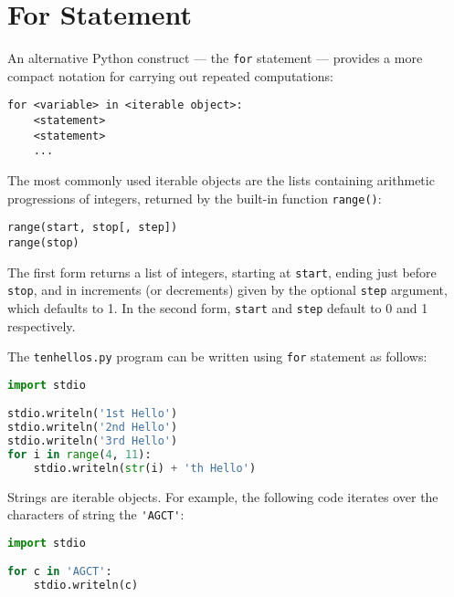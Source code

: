 \documentclass[8pt,a4paper,compress,handout]{beamer}
\begin{document}
\section{For Statement}
\begin{frame}[fragile]
An alternative Python construct --- the \lstinline{for} statement --- provides a more compact notation for carrying out repeated computations:

\smallskip

\begin{lstlisting}[language={}]
for <variable> in <iterable object>:
    <statement>
    <statement>
    ...
\end{lstlisting}

\bigskip

The most commonly used iterable objects are the lists containing arithmetic progressions of integers, returned by the built-in function \lstinline{range()}:

\begin{lstlisting}[language={}]
range(start, stop[, step])
range(stop)
\end{lstlisting}

The first form returns a list of integers, starting at \lstinline{start}, ending just before \lstinline{stop}, and in increments (or decrements) given by the optional \lstinline{step} argument, which defaults to 1. In the second form, \lstinline{start} and \lstinline{step} default to 0 and 1 respectively.
\end{frame}

\begin{frame}[fragile]
The \lstinline{tenhellos.py} program can be written using \lstinline{for} statement as follows:

\begin{lstlisting}[language=Python]
import stdio

stdio.writeln('1st Hello')
stdio.writeln('2nd Hello')
stdio.writeln('3rd Hello')
for i in range(4, 11):
    stdio.writeln(str(i) + 'th Hello')
\end{lstlisting}

\bigskip

Strings are iterable objects. For example, the following code iterates over the characters of string the \lstinline{'AGCT'}:
\begin{lstlisting}[language=Python]
import stdio

for c in 'AGCT':
    stdio.writeln(c)
\end{lstlisting}
\end{frame}
\end{document}
